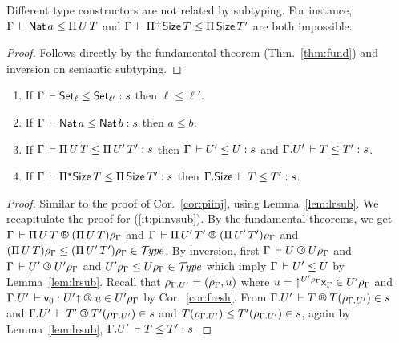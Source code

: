 \documentclass[acmlarge,review,anonymous]{acmart}\settopmatter{printfolios=true}
\begin{document}
\begin{lemma}
  \label{lem:discr}
  Different type constructors are not related by subtyping.  For instance,
  $\Gamma \der \Nat a \leq \piT U T$ and
  $\Gamma \der \erpiT \Size T \leq \piT \Size T'$ are both impossible.
\end{lemma}
\begin{proof}
  Follows directly by the fundamental theorem (Thm.~\ref{thm:fund}) and inversion on semantic subtyping.
\end{proof}



\begin{lemma}
\label{lem:invsubty}
\bla
\begin{enumerate}
\item \label{it:setinvsub}
  If\/ $\Gamma \der \Set[\ell] \leq \Set[\ell'] : s$ then $\ell \leq \ell'$.
\item \label{it:natinvsub}
  If\/ $\Gamma \der \Nat a \leq \Nat b : s$ then $a \leq b$.
\item \label{it:piinvsub}
  If\/ $\Gamma \der \piT U T \leq \piT{U'}{T'} : s$ then
  $\Gamma \der U' \leq U : s$ and
  $\cext \Gamma {U'} \der T \leq T' : s$.
\item \label{it:allinvsub}
  If\/ $\Gamma \der \epiT \Size T \leq \piT{\Size}{T'} : s$ then
  $\cext \Gamma \Size \der T \leq T' : s$.
\end{enumerate}
\end{lemma}
\begin{proof}
Similar to the proof of Cor.~\ref{cor:piinj}, using Lemma~\ref{lem:lrsub}.
We recapitulate the proof for (\ref{it:piinvsub}).
By the fundamental theorems, we get
$\RG \Gamma {\piT U T} {(\piT U T)\rhog}$ and
$\RG \Gamma {\piT {U'} {T'}} {(\piT {U'} {T'})\rhog}$ and
${(\piT U T)\rhog} \leq {(\piT {U'} {T'})\rhog} \in \TYPE$.
By inversion, first
$\RG \Gamma U {U\rhog}$ and
$\RG \Gamma {U'} {U'\rhog}$ and
$U'\rhog \leq U\rhog \in \TYPE$ which imply $\Gamma \der U' \leq U$ by Lemma~\ref{lem:lrsub}.
Recall that
$\rhogup = (\rhog, u)$ where
$u = \up{U'\rhog} \var\Gamma \in U'\rhog$ and
$\LR {\cext \Gamma U'} {\ind0} {U'\slift} {u} {U'\rhog}$ by Cor.~\ref{cor:fresh}.
From
$\LRTS {\cext \Gamma U'} T {T(\rhogup)} s$ and
$\LRTS {\cext \Gamma U'} {T'} {T'(\rhogup)} s$ and
$T(\rhogup) \leq T'(\rhogup) \in s$, again by Lemma~\ref{lem:lrsub},
$\cext \Gamma {U'} \der T \leq T' : s$.
\end{proof}
\end{document}
